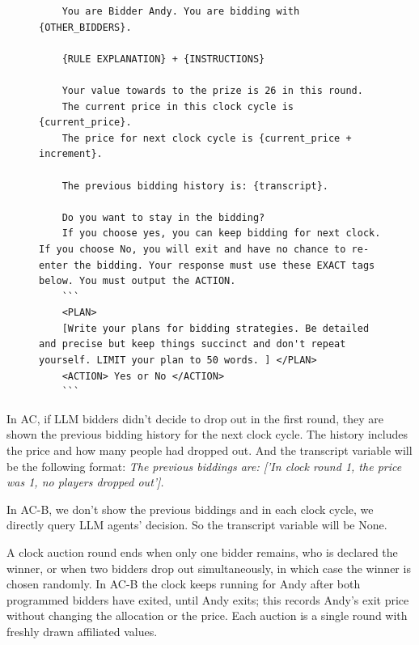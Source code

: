 \documentclass[acmsmall,screen,review]{acmart}
\newcommand{\rev}[1]{{\color{blue}#1}}
\newcommand{\rev}[1]{#1}
\begin{document}
\begin{figure}[htbp]
\centering
\begin{minipage}{0.95\textwidth}
\begin{lstlisting}
    You are Bidder Andy. You are bidding with {OTHER_BIDDERS}.

    {RULE EXPLANATION} + {INSTRUCTIONS}

    Your value towards to the prize is 26 in this round.
    The current price in this clock cycle is {current_price}.
    The price for next clock cycle is {current_price + increment}.

    The previous bidding history is: {transcript}.

    Do you want to stay in the bidding?
    If you choose yes, you can keep bidding for next clock. If you choose No, you will exit and have no chance to re-enter the bidding. Your response must use these EXACT tags below. You must output the ACTION.
    ```
    <PLAN>
    [Write your plans for bidding strategies. Be detailed and precise but keep things succinct and don't repeat yourself. LIMIT your plan to 50 words. ] </PLAN>
    <ACTION> Yes or No </ACTION>
    ```
\end{lstlisting}
\end{minipage}
\label{fig:ac_prompt}
\end{figure}

In AC, if LLM bidders didn't decide to drop out in the first round, they are shown the previous bidding history for the next clock cycle. The history includes the price and how many people had dropped out.
And the transcript variable will be the following format:
\textit{    The previous biddings are:
    ['In clock round 1, the price was 1,
    no players dropped out'].}

In AC-B, we don't show the previous biddings and in each clock cycle, we directly query LLM agents' decision.
So the transcript variable will be None.

A clock auction round ends when only one bidder remains, who is declared the winner, or when two bidders drop out simultaneously, in which case the winner is chosen randomly. \rev{In AC-B the clock keeps running for Andy after both programmed bidders have exited, until Andy exits; this records Andy's exit price without changing the allocation or the price. Each auction is a single round with freshly drawn affiliated values.}
\end{document}

